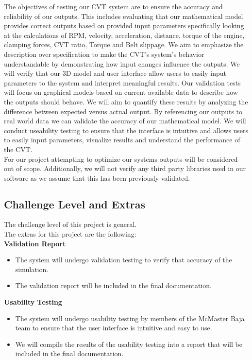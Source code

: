\documentclass[12pt, titlepage]{article}
\begin{document}
\noindent The objectives of testing our CVT system are to ensure the accuracy and reliability of our outputs. 
This includes evaluating that our mathematical model provides correct outputs based on provided input parameters specifically looking at the calculations of RPM, velocity, acceleration, distance, torque of the engine, clamping forces, CVT ratio, Torque and Belt slippage. 
We aim to emphasize the description over specification to make the CVT's system's behavior understandable by demonstrating how input changes influence the outputs.
We will verify that our 3D model and user interface allow users to easily input parameters to the system and interpret meaningful results. 
Our validation tests will focus on graphical models based on current available data to describe how the outputs should behave. 
We will aim to quantify these results by analyzing the difference between expected versus actual output. 
By referencing our outputs to real world data we can validate the accuracy of our mathematical model.
We will conduct useability testing to ensure that the interface is intuitive and allows users to easily input parameters, visualize results and understand the performance of the CVT.
\\
\noindent For our project attempting to optimize our systems outputs will be considered out of scope. 
Additionally, we will not verify any third party libraries used in our software as we assume that this has been previously validated. 

\subsection{Challenge Level and Extras}

The challenge level of this project is general.\\
\newline
The extras for this project are the following:\\
\textbf{Validation Report}
{\begin{itemize}
  \item The system will undergo validation testing to verify that accuracy of the simulation.
  \item The validation report will be included in the final documentation.
\end{itemize}}
{\noindent}
\textbf{Usability Testing}
{\begin{itemize}
  \item The system will undergo usability testing by members of the McMaster Baja team to ensure that
  the user interface is intuitive and easy to use.
  \item We will compile the results of the usability testing into a report that will be included in the final documentation.
\end{itemize}}
\end{document}
